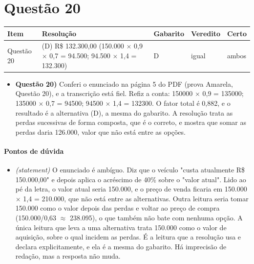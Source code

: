 \documentclass{article}%
\begin{document}
\section*{Questão 20}%
\begin{longtable}{@{}p{} p{} p{} p{} p{}@{}}\toprule Item & Resolução & Gabarito & Veredito & Certo \\ \midrule
Questão 20 & (D) R\$ 132.300,00 (150.000 $\times$ 0,9 $\times$ 0,7 = 94.500; 94.500 $\times$ 1,4 = 132.300) & D & igual & ambos \\
\bottomrule\end{longtable}%
\begin{itemize}%
\item%
\textbf{Questão 20)} Conferi o enunciado na página 5 do PDF (prova Amarela, Questão 20), e a transcrição está fiel. Refiz a conta: 150000 $\times$ 0,9 = 135000; 135000 $\times$ 0,7 = 94500; 94500 $\times$ 1,4 = 132300. O fator total é 0,882, e o resultado é a alternativa (D), a mesma do gabarito. A resolução trata as perdas sucessivas de forma composta, que é o correto, e mostra que somar as perdas daria 126.000, valor que não está entre as opções.%
\end{itemize}%
\paragraph{Pontos de dúvida}%
\begin{itemize}%
\item%
\textit{(statement)} O enunciado é ambíguo. Diz que o veículo "custa atualmente R\$ 150.000,00" e depois aplica o acréscimo de 40\% sobre o "valor atual". Lido ao pé da letra, o valor atual seria 150.000, e o preço de venda ficaria em 150.000 $\times$ 1,4 = 210.000, que não está entre as alternativas. Outra leitura seria tomar 150.000 como o valor depois das perdas e voltar ao preço de compra (150.000/0,63 $\approx$ 238.095), o que também não bate com nenhuma opção. A única leitura que leva a uma alternativa trata 150.000 como o valor de aquisição, sobre o qual incidem as perdas. É a leitura que a resolução usa e declara explicitamente, e ela é a mesma do gabarito. Há imprecisão de redação, mas a resposta não muda.%
\end{itemize}%
\end{document}
